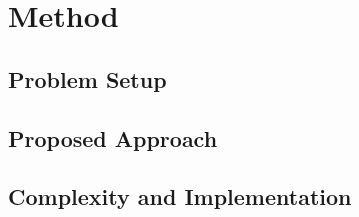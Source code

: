 \section{Method}
\label{sec:method}

\subsection{Problem Setup}

\subsection{Proposed Approach}

\subsection{Complexity and Implementation}
